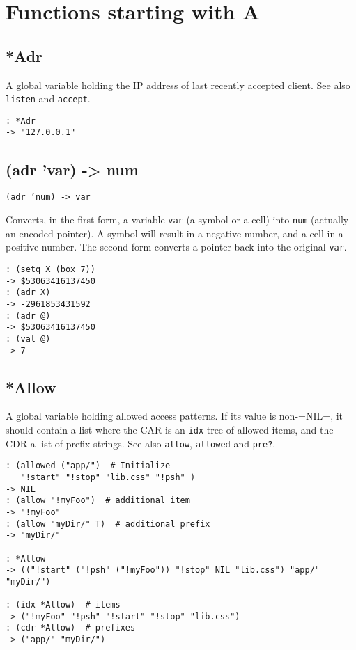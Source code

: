 % 


\chapter{Functions starting with A}
\label{sec-8-1-1}

 
\section{*Adr}
\label{sec-8-1-1-1}


A global variable holding the IP address of last recently accepted
client. See also \texttt{listen} and \texttt{accept}.


\begin{verbatim}
: *Adr
-> "127.0.0.1"
\end{verbatim}

 
\section{(adr 'var) -> num}
\label{sec-8-1-1-2}


\texttt{(adr 'num) -> var}

Converts, in the first form, a variable \texttt{var} (a symbol or a cell) into
\texttt{num} (actually an encoded pointer). A symbol will result in a negative
number, and a cell in a positive number. The second form converts a
pointer back into the original \texttt{var}.


\begin{verbatim}
: (setq X (box 7))
-> $53063416137450
: (adr X)
-> -2961853431592
: (adr @)
-> $53063416137450
: (val @)
-> 7
\end{verbatim}

 
\section{*Allow}
\label{sec-8-1-1-3}


A global variable holding allowed access patterns. If its value is
non-=NIL=, it should contain a list where the CAR is an \texttt{idx} tree of
allowed items, and the CDR a list of prefix strings. See also \texttt{allow},
\texttt{allowed} and \texttt{pre?}.


\begin{verbatim}
: (allowed ("app/")  # Initialize
   "!start" "!stop" "lib.css" "!psh" )
-> NIL
: (allow "!myFoo")  # additional item
-> "!myFoo"
: (allow "myDir/" T)  # additional prefix
-> "myDir/"

: *Allow
-> (("!start" ("!psh" ("!myFoo")) "!stop" NIL "lib.css") "app/" "myDir/")

: (idx *Allow)  # items
-> ("!myFoo" "!psh" "!start" "!stop" "lib.css")
: (cdr *Allow)  # prefixes
-> ("app/" "myDir/")
\end{verbatim}

